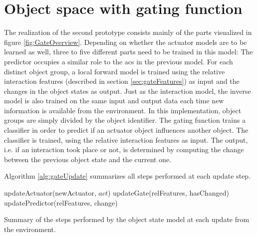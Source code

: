 \section{Object space with gating function \label{sec:gateRealization}}

The realization of the second prototype consists mainly of the parts visualized in figure \ref{fig:GateOverview}. 
Depending on whether the actuator models are to be learned as well, three to five different parts need to be trained in this model: The predictor occupies a similar role to the \glspl{ac} in the previous model. For each distinct object group, a local forward model is trained using the relative interaction features (described in section \ref{sec:gateFeatures}) as input and the changes in the object states as output. Just as the interaction model, the inverse model is also trained on the same input and output data each time new information is available from the environment. 
In this implementation, object groups are simply divided by the object identifier. 
The gating function trains a classifier in order to predict if an actuator object influences another object. The classifier is trained, using the relative interaction features as input. The output, i.e. if an interaction took place or not, is determined by computing the change between the previous object state and the current one.

Algorithm \ref{alg:gateUpdate} summarizes all steps performed at each update step.

\begin{algorithm}
\begin{algorithmic}[1]
	\Statex
	\State updateActuator(newActuator, $act$)
		\State updateGate(relFeatures, hasChanged)
			\State updatePredictor(relFeatures, change)
		\EndIf
	\EndFor
\end{algorithmic}
\caption{Summary of the steps performed by the object state model at each update from the environment.}
\label{alg:gateUpdate}
\end{algorithm}


